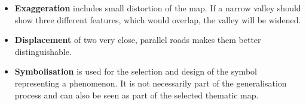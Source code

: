 \begin{itemize}
\item \textbf{Exaggeration} includes small distortion of the map. If a narrow valley should show three different features, which would overlap, the valley will be widened.

\item \textbf{Displacement} of two very close, parallel roads makes them better distinguishable.

\item \textbf{Symbolisation} is used for the selection and design of the symbol representing a phenomenon. It is not necessarily part of the generalisation process and can also be seen as part of the selected thematic map.

\end{itemize}